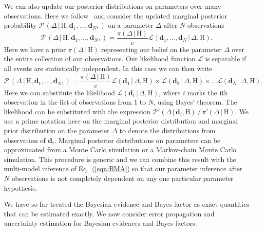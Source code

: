 We can also update our posterior distributions on parameters over many observations. Here we follow~\cite{dpac_technical} and consider the updated marginal posterior probability $\mathcal{P} \, \left(\Delta \, | \, \mathrm{H}, \mathbf{d}_1, \ldots, \mathbf{d}_N, \right)$ on a parameter $\Delta$ after $N$ observations
\begin{equation}
    \mathcal{P} \, \left(\Delta \, | \, \mathrm{H}, \mathbf{d}_1, \ldots, \mathbf{d}_N, \right) = \frac{\pi (\Delta \, | \, \mathrm{H} )}{c} \mathcal{L} (\mathbf{d}_1, \ldots, \mathbf{d}_N \, | \, \Delta , \mathrm{H}). 
\end{equation}
Here we have a prior $\pi (\Delta \, | \, \mathrm{H} )$ representing our belief on the parameter $\Delta$ over the entire collection of our observations. Our likelihood function $\mathcal{L}$ is separable if all events are statistically independent. In this case we can then write
\begin{equation}
    \mathcal{P} \, \left(\Delta \, | \, \mathrm{H}, \mathbf{d}_1, \ldots, \mathbf{d}_N, \right) = \frac{\pi (\Delta \, | \, \mathrm{H} )}{c} \mathcal{L} (\mathbf{d}_1  \, | \, \Delta , \mathrm{H}) \times \mathcal{L} (\mathbf{d}_2  \, | \, \Delta , \mathrm{H}) \times \ldots \mathcal{L} (\mathbf{d}_N  \, | \, \Delta , \mathrm{H}).
\end{equation}
Here we can substitute the likelihood $\mathcal{L}(\mathbf{d}_i  \, | \, \Delta , \mathrm{H})$, where $i$ marks the ith observation in the list of observations from $1$ to $N$, using Bayes' theorem. The likelihood can be substituted with the expression $\mathcal{P}' (\Delta \, | \, \mathbf{d}_i, \mathrm{H}) \, / \, \pi'(\Delta \, | \, \mathrm{H})$. We use a prime notation here on the marginal posterior distribution and marginal prior distribution on the parameter $\Delta$ to denote the distributions from observation of $\mathbf{d}_i$. Marginal posterior distributions on parameters can be approximated from a Monte Carlo simulation or a Markov-chain Monte Carlo simulation. This procedure is generic and we can combine this result with the multi-model inference of Eq.~(\ref{eqn:BMA}) so that our parameter inference after $N$ observations is not completely dependent on any one particular parameter hypothesis.

We have so far treated the Bayesian evidence and Bayes factor as exact quantities that can be estimated exactly. We now consider error propagation and uncertainty estimation for Bayesian evidences and Bayes factors.

